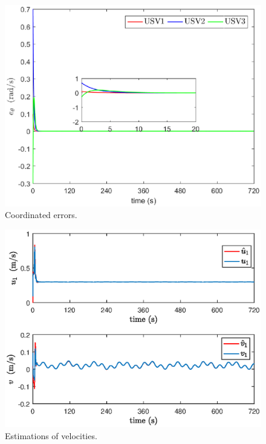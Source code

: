 \documentclass[a4paper,fleqn]{cas-dc}
\begin{document}
\begin{figure}[!htb]
	\centering
	\includegraphics[width=\hsize]{coordinateError.eps}
	\caption{Coordinated errors.}
	\label{fig9}
\end{figure}

\begin{figure}[!htb]
	\centering
	\includegraphics[width=\hsize]{NLESO.eps}
	\caption{Estimations of velocities.}
	\label{fig10}
\end{figure}
\end{document}
